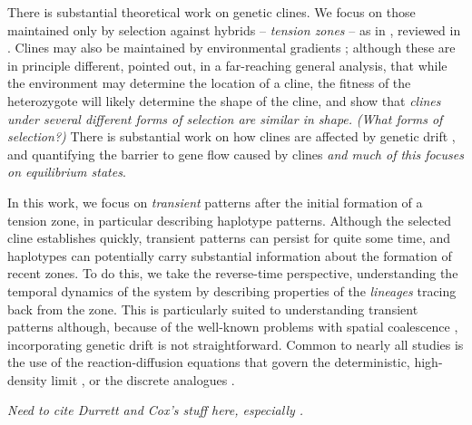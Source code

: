 \documentclass[11pt,letterpaper]{article}
\newcommand{\alisa}[1]{{\em \color{red} #1}}
\newcommand{\plr}[1]{{\em \color{blue} #1}}
\begin{document}
There is substantial theoretical work on genetic clines.
We focus on those maintained only by selection against hybrids -- \emph{tension zones} --
as in \citet{Bazykin1969}, reviewed in \citet{Barton1985}.
Clines may also be maintained by environmental gradients \citep{Haldane1948,fisher1950frequencies};
although these are in principle different,
\citet{Slatkin1973} pointed out, in a far-reaching general analysis,
that while the environment may determine the location of a cline,
the fitness of the heterozygote will likely determine the shape of the cline,
and \citet{barton1986barrier} show that \alisa{clines under several different forms of selection are similar in shape.}
\plr{(What forms of selection?)}
There is substantial work on how clines are affected by genetic drift \citep{Slatkin1975,felsenstein1975genetic,barton2008effect,Polechova2011},
and quantifying the barrier to gene flow caused by clines \citep{barton1979gene,Barton1989,Barton1993,Barton2000} \alisa{and much of this focuses on equilibrium states}.

In this work, we focus on \emph{transient} patterns after the initial formation of a tension zone,
in particular describing haplotype patterns.
Although the selected cline establishes quickly, transient patterns can persist for quite some time,
and  haplotypes can potentially carry substantial information about the formation of recent zones.
To do this, we take the reverse-time perspective,
understanding the temporal dynamics of the system by describing properties of the \emph{lineages} tracing back from the zone.
This is particularly suited to understanding transient patterns 
although, because of the well-known problems with spatial coalescence \citep{felsenstein1975pain,barton2002continuous},
incorporating genetic drift is not straightforward.
Common to nearly all studies is the use of the
reaction-diffusion equations that govern the deterministic, high-density limit \citep[as in][]{Nagylaki1975},
or the discrete analogues \citep{hanson1966effects}.

\plr{Need to cite Durrett and Cox's stuff here, especially \citet{durrett2007width}.}

\end{document}

